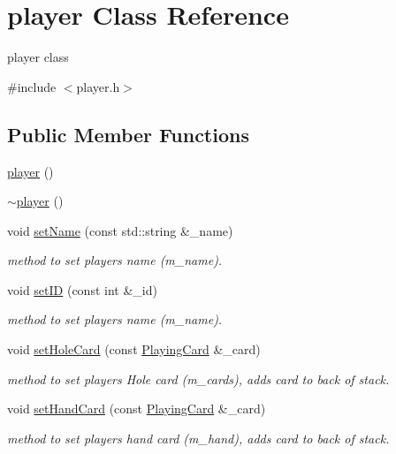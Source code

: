 \hypertarget{classplayer}{\section{player Class Reference}
\label{classplayer}
}


player class  




{\ttfamily \#include $<$player.\-h$>$}

\subsection*{Public Member Functions}
\begin{DoxyCompactItemize}
\item 
\hyperlink{classplayer_a97de83bce15f880241f561b55b016b02}{player} ()
\item 
\hyperlink{classplayer_aab5d2e47b80e0481f09ca0df8b823057}{$\sim$player} ()
\item 
void \hyperlink{classplayer_a7d80b7b79c7ed9b4970989e70fb8e3e4}{set\-Name} (const std\-::string \&\-\_\-name)
\begin{DoxyCompactList}\small\item\em method to set players name (m\-\_\-name). \end{DoxyCompactList}\item 
void \hyperlink{classplayer_ae16ccb54982aa257a59de10e8dd1b9cc}{set\-I\-D} (const int \&\-\_\-id)
\begin{DoxyCompactList}\small\item\em method to set players name (m\-\_\-name). \end{DoxyCompactList}\item 
void \hyperlink{classplayer_ad66aadc84c419830fbae4388e1ba4a56}{set\-Hole\-Card} (const \hyperlink{classPlayingCard}{Playing\-Card} \&\-\_\-card)
\begin{DoxyCompactList}\small\item\em method to set players Hole card (m\-\_\-cards), adds card to back of stack. \end{DoxyCompactList}\item 
void \hyperlink{classplayer_ace9ccadf69b140b94dae999299634057}{set\-Hand\-Card} (const \hyperlink{classPlayingCard}{Playing\-Card} \&\-\_\-card)
\begin{DoxyCompactList}\small\item\em method to set players hand card (m\-\_\-hand), adds card to back of stack. \end{DoxyCompactList}\item 

\end{DoxyCompactItemize}
